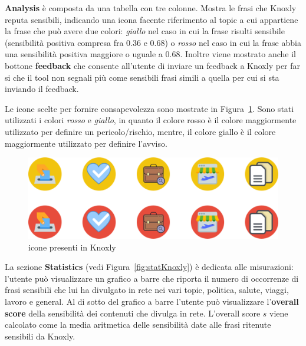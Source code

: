 \textbf{Analysis} è composta da una tabella con tre colonne. Mostra le frasi che Knoxly reputa sensibili, indicando una icona facente riferimento al topic a cui appartiene la frase che può avere due colori: \textit{giallo} nel caso in cui la frase risulti sensibile (sensibilità positiva compresa fra $0.36$ e $0.68$) o \textit{rosso} nel caso in cui la frase abbia una sensibilità positiva maggiore o uguale a $0.68$. Inoltre viene mostrato anche il bottone \textbf{feedback} che consente all'utente di inviare un feedback a Knoxly per far si che il tool non segnali più come sensibili frasi simili a quella per cui si sta inviando il feedback.

Le icone scelte per fornire consapevolezza sono mostrate in Figura~\ref{fig:bollini}. Sono stati utilizzati i colori \textit{rosso} e \textit{giallo}, in quanto il colore rosso è il colore maggiormente utilizzato per definire un pericolo/rischio, mentre, il colore giallo è il colore maggiormente utilizzato per definire l'avviso.
\begin{figure}[h!t]
    \centering
    \includegraphics[scale=0.5]{Figure/ui/bollini.png}
    \caption{icone presenti in Knoxly}
    \label{fig:bollini}
\end{figure}
\FloatBarrier


La sezione \textbf{Statistics} (vedi Figura~\ref{fig:statKnoxly}) è dedicata alle misurazioni: l'utente può visualizzare un grafico a barre che riporta il numero di occorrenze di frasi sensibili che lui ha divulgato in rete nei vari topic, politica, salute, viaggi, lavoro e general. Al di sotto del grafico a barre l'utente può visualizzare l'\textbf{overall score} della sensibilità dei contenuti che divulga in rete. L'overall score $s$ viene calcolato come la media aritmetica delle sensibilità date alle frasi ritenute sensibili da Knoxly.

